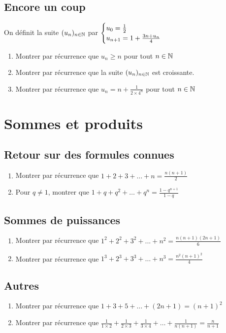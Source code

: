 \documentclass[oneside,12pt]{book}          %
\begin{document}
\subsection{Encore un coup}
On définit la suite ${(u_{n})_{n\in\mathbb N}}$ par $\defsuite{u_0=\frac{1}{2}}{1+\frac{3n+u_n}{4}}$
\begin{enumerate}
    \item Montrer par récurrence que $u_n\geq n$ pour tout ${n\in\mathbb N}$
    \item Montrer par récurrence que la suite ${(u_{n})_{n\in\mathbb N}}$ est croissante.
    \item Montrer par récurrence que $u_n=n+\frac{1}{2\times4^n}$ pour tout ${n\in\mathbb N}$
\end{enumerate}


\section{Sommes et produits}


\subsection{Retour sur des formules connues}
\begin{enumerate}
    \item Montrer par récurrence que $1+2+3+\ldots+n=\frac{n(n+1)}{2}$
    \item Pour $q\neq1$, montrer que $1+q+q^2+\ldots+q^n=\frac{1-q^{n+1}}{1-q}$
\end{enumerate}



\subsection{Sommes de puissances}
\begin{enumerate}

    \item Montrer par récurrence que $1^2+2^2+3^2+...+n^2=\frac{n(n+1)(2n+1)}{6}$
    \item Montrer par récurrence que $1^3+2^3+3^3+\ldots+n^3=\frac{n^2(n+1)^2}{4}$
\end{enumerate}



\subsection{Autres}
\begin{enumerate}
    \item Montrer par récurrence que $1+3+5+\ldots+(2n+1)=(n+1)^2$
    \item Montrer par récurrence que $\frac{1}{1\times2}+\frac{1}{2\times3}+\frac{1}{3\times4}+\ldots+\frac{1}{n(n+1)}=\frac{n}{n+1}$
\end{enumerate}
\end{document}
